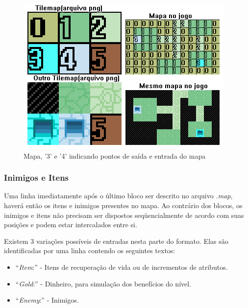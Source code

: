 \begin{figure}[h]
	\centering
	\label{fig08}
		\includegraphics[keepaspectratio=true,scale=0.5]{figuras/fig08-map.png}
	\caption{Mapa, '3' e '4' indicando pontos de saída e entrada do mapa}
\end{figure}

\subsubsection{Inimigos e Itens}

Uma linha imediatamente após o último bloco ser descrito no arquivo \textit{.map}, haverá então os itens e inimigos presentes no mapa.
Ao contrário dos blocos, os inimigos e itens não precisam ser dispostos seqüencialmente de acordo com suas posições e podem estar intercalados entre si.

Existem 3 variações possíveis de entradas nesta parte do formato. Elas são identificadas por uma linha contendo os seguintes textos:
\begin{itemize}
	\item ``\textit{Item}:'' - Itens de recuperação de vida ou de incrementos de atributos.
	\item ``\textit{Gold}:'' - Dinheiro, para simulação dos benefícios do nível.
	\item ``\textit{Enemy}:'' - Inimigos.
\end{itemize}

